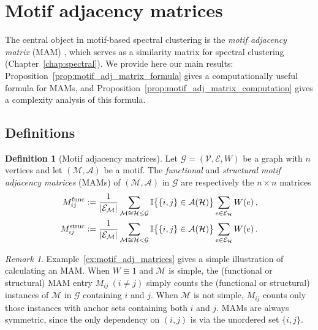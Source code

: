 \documentclass[12pt,draft]{ociamthesis}
\theoremstyle{plain}
\theoremstyle{definition}
\newtheorem{definition}{Definition}[chapter]
\theoremstyle{remark}
\newtheorem*{remark}{Remark}
\newcommand\bb[1]{\mathbb{#1}}
\newcommand\ca[1]{\mathcal{#1}}
\begin{document}
\section{Motif adjacency matrices} \label{sec:graphs_motif_adj_matrices}

The central object in motif-based spectral clustering is the \emph{motif
adjacency matrix} (MAM) \cite{benson2016higher}, which serves as a similarity
matrix for spectral clustering (Chapter~\ref{chap:spectral}).
We provide here our main results:
Proposition~\ref{prop:motif_adj_matrix_formula} gives a computationally useful
formula for MAMs, and Proposition~\ref{prop:motif_adj_matrix_computation} gives
a complexity analysis of this formula.

\pagebreak

\subsection{Definitions}

\begin{definition}[Motif adjacency matrices] \label{def:motif_adj_matrices}
  Let $\ca{G} = (\ca{V,E},W)$ be a graph with $n$ vertices and let $\ca{(M,A)}$
  be a motif. The \emph{functional} and \emph{structural motif adjacency
  matrices} (MAMs) of $\ca{(M,A)}$ in $\ca{G}$ are respectively the $n \times
  n$ matrices
  \begin{align*}
    M^\mathrm{func}_{i j} &\vcentcolon= \frac{1}{|\ca{E_M}|} \sum_{\ca{M} \cong
    \ca{H} \leq \ca{G}} \bb{I} \big\{ \{i,j\} \in \ca{A}(\ca{H}) \big\}
    \sum_{e
    \in \ca{E_H}} W(e)\,, \\
    M^\mathrm{struc}_{i j} &\vcentcolon= \frac{1}{|\ca{E_M}|} \sum_{\ca{M} \cong
    \ca{H} < \ca{G}} \bb{I} \big\{ \{i,j\} \in \ca{A}(\ca{H}) \big\} \sum_{e
    \in \ca{E_H}} W(e)\,.
  \end{align*}
\end{definition}

\begin{remark}
  Example~\ref{ex:motif_adj_matrices} gives a simple illustration of
  calculating an MAM.
  When $W \equiv 1$ and $\ca{M}$ is simple, the (functional or structural) MAM
  entry $M_{i j} \ (i \neq j)$ simply counts the (functional or structural)
  instances of $\ca{M}$ in $\ca{G}$ containing $i$ and $j$.
  When $\ca{M}$ is not simple, $M_{i j}$ counts only those instances with anchor
  sets containing both $i$ and $j$.
  MAMs are always symmetric, since the only dependency on $(i,j)$ is via the
  unordered set $\{i,j\}$.
\end{remark}
\end{document}
